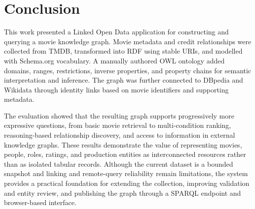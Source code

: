 \section{Conclusion}\label{sec:conclusion}

This work presented a Linked Open Data application for constructing and
querying a movie knowledge graph. Movie metadata and credit relationships
were collected from TMDB, transformed into RDF using stable URIs, and
modelled with Schema.org vocabulary. A manually authored OWL ontology added
domains, ranges, restrictions, inverse properties, and property chains for
semantic interpretation and inference. The graph was further connected to
DBpedia and Wikidata through identity links based on movie identifiers and
supporting metadata.

The evaluation showed that the resulting graph supports progressively more
expressive questions, from basic movie retrieval to multi-condition ranking,
reasoning-based relationship discovery, and access to information in external
knowledge graphs. These results demonstrate the value of representing movies,
people, roles, ratings, and production entities as interconnected resources
rather than as isolated tabular records. Although the current dataset is a
bounded snapshot and linking and remote-query reliability remain limitations,
the system provides a practical foundation for extending the collection,
improving validation and entity review, and publishing the graph through a
SPARQL endpoint and browser-based interface.